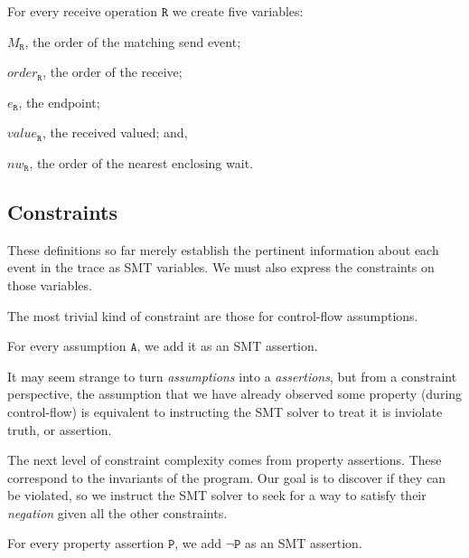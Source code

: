 \begin{definition}[Receive] \label{def:rcv}
For every receive operation $\mathtt{R}$ we create five variables:
\begin{compactenum}
\item $M_\mathtt{R}$, the order of the matching send event;

\item $\mathit{order}_\mathtt{R}$, the order of the receive;

\item $e_\mathtt{R}$, the endpoint;

\item $\mathit{value}_\mathtt{R}$, the received valued; and,

\item $\mathit{nw}_\mathtt{R}$, the order of the nearest enclosing wait.
\end{compactenum}
\end{definition}

\subsection{Constraints}

These definitions so far merely establish the pertinent information
about each event in the trace as SMT variables. We must also express
the constraints on those variables.

The most trivial kind of constraint are those for control-flow
assumptions.

\begin{definition}[Assumption] \label{def:assm}
For every assumption $\mathtt{A}$, we add it as an SMT assertion.
\end{definition}

It may seem strange to turn \emph{assumptions} into a
\emph{assertions}, but from a constraint perspective, the assumption
that we have already observed some property (during control-flow) is
equivalent to instructing the SMT solver to treat it is inviolate
truth, or assertion.

The next level of constraint complexity comes from property
assertions. These correspond to the invariants of the program. Our
goal is to discover if they can be violated, so we instruct the SMT
solver to seek for a way to satisfy their \emph{negation} given all
the other constraints.

\begin{definition} \label{def:assert}
For every property assertion $\mathtt{P}$, we add $\neg \mathtt{P}$ as
an SMT assertion.
\end{definition}

